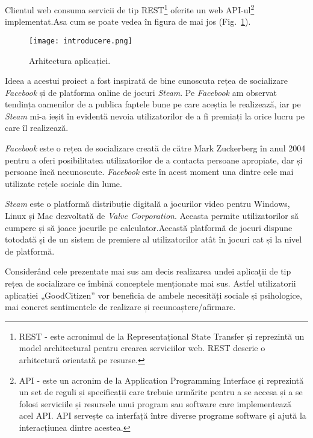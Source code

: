 Clientul web consuma servicii de tip REST\footnote{REST - este acronimul de la Representațional State Transfer  și reprezintă un model architectural pentru crearea serviciilor web. 
REST descrie o arhitectură orientată pe resurse.} oferite un web API-ul\footnote{API - este un acronim de la Application Programming Interface și reprezintă un set de reguli și 
specificații care trebuie urmărite pentru a se accesa și a se folosi serviciile și resursele unui program sau 
software care implementează acel API. API servește ca interfață între diverse programe software și ajută la 
interacțiunea dintre acestea.
} implementat.Asa cum se poate vedea în figura de mai jos (Fig.~\ref{fig:introducere}).
\begin{figure}[h]
\texttt{[image: introducere.png]}
\centering
\caption{Arhitectura aplicației.}
\label{fig:introducere}
\end{figure}

Ideea a acestui proiect a fost inspirată de bine cunoscuta rețea de socializare \textit{Facebook} și de platforma online de jocuri \textit{Steam}.
Pe \textit{Facebook} am observat tendința oamenilor de a publica faptele bune pe care aceștia le realizează, iar pe \textit{Steam} mi-a ieșit în evidentă nevoia 
utilizatorilor de a fi premiați la orice lucru pe care îl realizează.

\textit{Facebook} este o rețea de socializare creată de către Mark Zuckerberg în anul 2004 pentru a oferi posibilitatea utilizatorilor de a contacta persoane apropiate, dar și persoane încă necunoscute.
 \textit{Facebook} este în acest moment una dintre cele mai utilizate rețele sociale din lume.
 
\textit{Steam} este o platformă distribuție digitală a jocurilor video pentru Windows, Linux și Mac dezvoltată de \textit{Valve Corporation}. 
Aceasta permite utilizatorilor să cumpere și să joace jocurile pe calculator.Această platformă de jocuri dispune totodată și de un sistem de premiere 
al utilizatorilor atât în jocuri cat și la nivel de platformă.

Considerând cele prezentate mai sus am decis realizarea undei aplicații de tip rețea de socializare ce îmbină conceptele menționate mai sus.
Astfel utilizatorii aplicației „GoodCitizen” vor beneficia de ambele necesități sociale și psihologice, mai concret sentimentele de realizare și recunoaștere/afirmare. 

